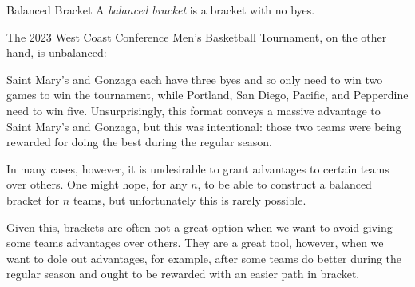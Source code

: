 {\begin{definition}{Balanced Bracket}{}
    A \textit{balanced bracket} is a bracket with no byes.
\end{definition} 

The 2023 West Coast Conference Men's Basketball Tournament, on the other hand, is unbalanced:

Saint Mary's and Gonzaga each have three byes and so only need to win two games to win the tournament, while Portland, San Diego, Pacific, and Pepperdine need to win five. Unsurprisingly, this format conveys a massive advantage to Saint Mary's and Gonzaga, but this was intentional: those two teams were being rewarded for doing the best during the regular season.

In many cases, however, it is undesirable to grant advantages to certain teams over others. One might hope, for any $n$, to be able to construct a balanced bracket for $n$ teams, but unfortunately this is rarely possible.




Given this, brackets are often not a great option when we want to avoid giving some teams advantages over others. They are a great tool, however, when we want to dole out advantages, for example, after some teams do better during the regular season and ought to be rewarded with an easier path in bracket.


}